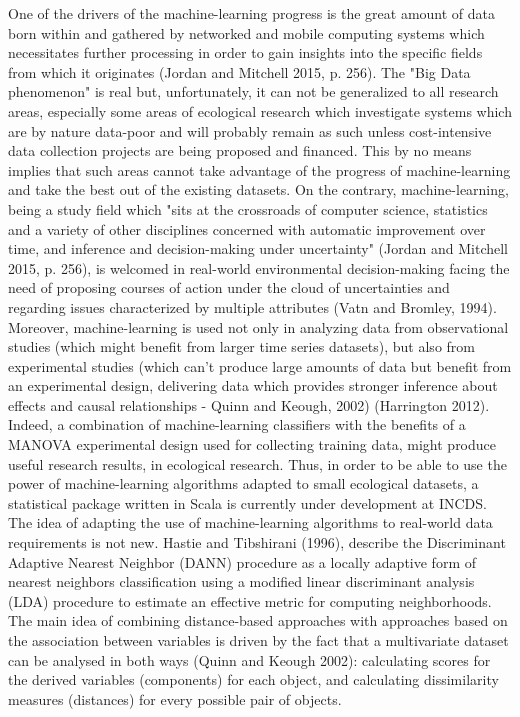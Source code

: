 \documentclass[journal]{IEEEtran}
\begin{document}
One of the drivers of the machine-learning progress is the great amount of data born within and gathered by networked and mobile computing systems which necessitates further processing in order to gain insights into the specific fields from which it originates (Jordan and Mitchell 2015, p. 256). 
The "Big Data phenomenon" is real but, unfortunately, it can not be generalized to all research areas, especially some areas of ecological research which investigate systems which are by nature data-poor and will probably remain as such unless cost-intensive data collection projects are being proposed and financed. This by no means implies that such areas cannot take advantage of the progress of machine-learning and take the best out of the existing datasets.        
On the contrary, machine-learning, being a study field which "sits at the crossroads of computer science, statistics and a variety of other disciplines concerned with automatic improvement over time, and inference and decision-making under uncertainty" (Jordan and Mitchell 2015, p. 256), is welcomed in real-world environmental decision-making facing the need of proposing courses of action under the cloud of uncertainties and regarding issues characterized by multiple attributes (Vatn and Bromley, 1994).   
Moreover, machine-learning is used not only in analyzing data from observational studies (which might benefit from larger time series datasets), but also from experimental studies (which can't produce large amounts of data but benefit from an experimental design, delivering data which provides stronger inference about effects and causal relationships - Quinn and Keough, 2002) (Harrington 2012).
Indeed, a combination of machine-learning classifiers with the benefits of a MANOVA experimental design used for collecting training data, might produce useful research results, in ecological research. Thus, in order to be able to use the power of machine-learning algorithms adapted to small ecological datasets, a statistical package written in Scala is currently under development at INCDS.\\


The idea of adapting the use of machine-learning algorithms to real-world data requirements is not new. 
Hastie and Tibshirani (1996), describe the Discriminant Adaptive Nearest Neighbor (DANN) procedure as a locally adaptive form of nearest neighbors classification using a modified linear discriminant analysis (LDA) procedure to estimate an effective metric for computing neighborhoods.
The main idea of combining distance-based approaches with approaches based on the association between variables is driven by the fact that a multivariate dataset can be analysed in both ways (Quinn and Keough 2002): calculating scores for the derived variables (components) for each object, and calculating dissimilarity measures (distances) for every possible pair of objects.\\
\end{document}
